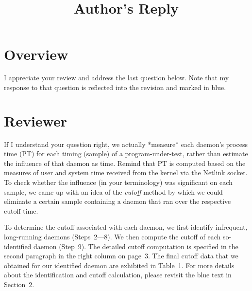 \documentclass[10pt,letterpaper]{article}
\newenvironment{myindentpar}[1]%
{\begin{list}{}
         {\vspace{10pt}
					\setlength{\leftmargin}{#1}}
          \item[]
}
{\end{list}}
\newcommand{\rev}[1]{\begin{myindentpar}{.25in} {\em {\color{blue}{#1}}}\end{myindentpar}}
\begin{document}
\title{Author's Reply}
\author{}
\maketitle

\section*{Overview}\label{sec:overview}
I appreciate your review and address the last question below. 
Note that my response to that question is 
reflected into the revision and marked in {\color{blue}blue}. 


\clearpage
\section*{Reviewer}\label{sec:rev1}

\rev{
$<<$ Reviewer's comments to the author(s) $>>$

The manuscript is well revised.

However, I have a question how to estimate each daemon's influence as time.
The estimation is important for accuracy of your proposed method.

For acceptance, please clarify the estimation method and its validity.

}

If I understand your question right, 
we actually *measure* each daemon's process time (PT) for each timing (sample) of a program-under-test, 
rather than estimate the influence of that daemon as time. 
Remind that PT is computed based on the measures of user and system time received from the kernel via 
the Netlink socket. To check whether the influence (in your terminology) was significant on each sample, 
we came up with an idea of the {\em cutoff} method by 
which we could eliminate a certain sample containing a daemon that ran over the respective cutoff time. 

To determine the cutoff associated with each daemon, we first identify infrequent, long-running daemons (\hbox{Steps~2---8}). 
We then compute the cutoff of each so-identified daemon (Step~9). 
The detailed cutoff computation is specified in the second paragraph in the right column on page~3. 
The final cutoff data that we obtained for our identified daemon are exhibited in Table~1. 
For more details about the identification and cutoff calculation, please revisit the blue text in Section~2. 
\end{document}
